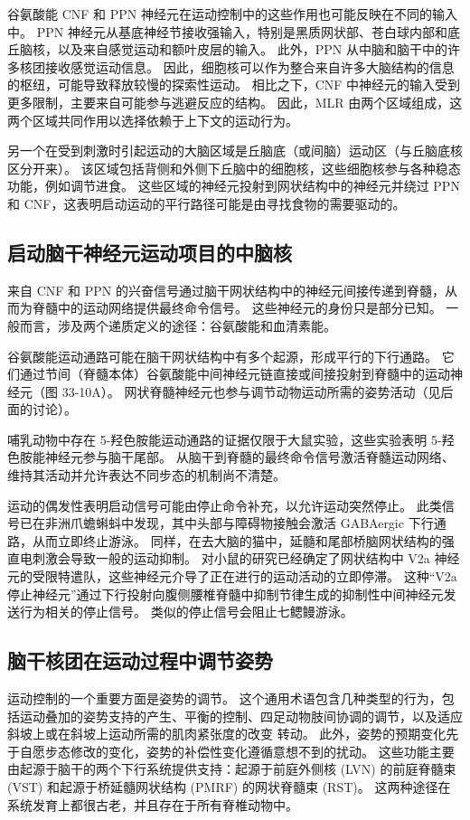 谷氨酸能 CNF 和 PPN 神经元在运动控制中的这些作用也可能反映在不同的输入中。 PPN 神经元从基底神经节接收强输入，特别是黑质网状部、苍白球内部和底丘脑核，以及来自感觉运动和额叶皮层的输入。 此外，PPN 从中脑和脑干中的许多核团接收感觉运动信息。 因此，细胞核可以作为整合来自许多大脑结构的信息的枢纽，可能导致释放较慢的探索性运动。 相比之下，CNF 中神经元的输入受到更多限制，主要来自可能参与逃避反应的结构。 因此，MLR 由两个区域组成，这两个区域共同作用以选择依赖于上下文的运动行为。

另一个在受到刺激时引起运动的大脑区域是丘脑底（或间脑）运动区（与丘脑底核区分开来）。 该区域包括背侧和外侧下丘脑中的细胞核，这些细胞核参与各种稳态功能，例如调节进食。 这些区域的神经元投射到网状结构中的神经元并绕过 PPN 和 CNF，这表明启动运动的平行路径可能是由寻找食物的需要驱动的。

\subsection{启动脑干神经元运动项目的中脑核}
来自 CNF 和 PPN 的兴奋信号通过脑干网状结构中的神经元间接传递到脊髓，从而为脊髓中的运动网络提供最终命令信号。 这些神经元的身份只是部分已知。 一般而言，涉及两个递质定义的途径：谷氨酸能和血清素能。

谷氨酸能运动通路可能在脑干网状结构中有多个起源，形成平行的下行通路。 它们通过节间（脊髓本体）谷氨酸能中间神经元链直接或间接投射到脊髓中的运动神经元（图 33-10A）。 网状脊髓神经元也参与调节动物运动所需的姿势活动（见后面的讨论）。

哺乳动物中存在 5-羟色胺能运动通路的证据仅限于大鼠实验，这些实验表明 5-羟色胺能神经元参与脑干尾部。 从脑干到脊髓的最终命令信号激活脊髓运动网络、维持其活动并允许表达不同步态的机制尚不清楚。

运动的偶发性表明启动信号可能由停止命令补充，以允许运动突然停止。 此类信号已在非洲爪蟾蝌蚪中发现，其中头部与障碍物接触会激活 GABAergic 下行通路，从而立即终止游泳。 同样，在去大脑的猫中，延髓和尾部桥脑网状结构的强直电刺激会导致一般的运动抑制。 对小鼠的研究已经确定了网状结构中 V2a 神经元的受限特遣队，这些神经元介导了正在进行的运动活动的立即停滞。 这种“V2a 停止神经元”通过下行投射向腹侧腰椎脊髓中抑制节律生成的抑制性中间神经元发送行为相关的停止信号。 类似的停止信号会阻止七鳃鳗游泳。

\subsection{脑干核团在运动过程中调节姿势}
运动控制的一个重要方面是姿势的调节。 这个通用术语包含几种类型的行为，包括运动叠加的姿势支持的产生、平衡的控制、四足动物肢间协调的调节，以及适应斜坡上或在斜坡上运动所需的肌肉紧张度的改变 转动。 此外，姿势的预期变化先于自愿步态修改的变化，姿势的补偿性变化遵循意想不到的扰动。 这些功能主要由起源于脑干的两个下行系统提供支持：起源于前庭外侧核 (LVN) 的前庭脊髓束 (VST) 和起源于桥延髓网状结构 (PMRF) 的网状脊髓束 (RST)。 这两种途径在系统发育上都很古老，并且存在于所有脊椎动物中。

